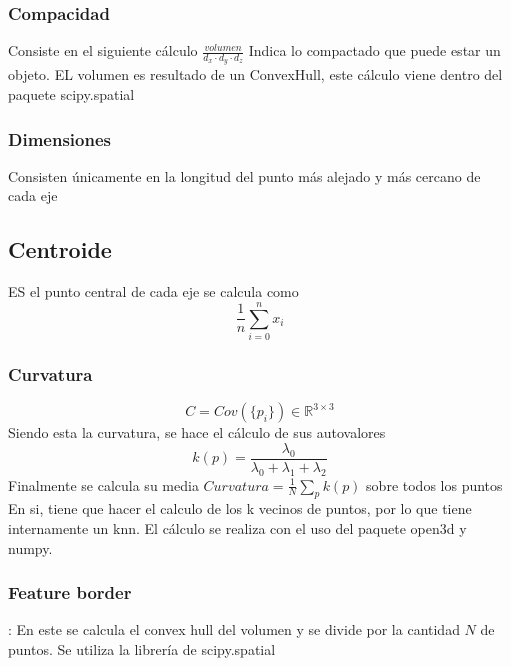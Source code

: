 \documentclass[conference]{IEEEtran}
\begin{document}
 \subsubsection{Compacidad}
 Consiste en el siguiente cálculo
 $\frac{volumen}{d_x\cdot d_y\cdot d_z}$
 Indica lo compactado que puede estar un objeto. EL volumen es resultado de un ConvexHull, este cálculo viene dentro del paquete scipy.spatial

 \subsubsection{Dimensiones}
 Consisten únicamente en la longitud del punto más alejado y más cercano de cada eje
 \subsection{Centroide}
 ES el punto central de cada eje se calcula como
 $$\frac{1}{n}\sum^n_{i=0} x_i$$
 \subsubsection{Curvatura}
 $$C=Cov(\{p_i\}) \in \mathbb{R}^{3\times 3}$$ Siendo esta la curvatura, se hace el cálculo de sus autovalores
 $$k(p)=\frac{\lambda_0}{\lambda_0+\lambda_1+\lambda_2}$$
 Finalmente se calcula su media $Curvatura=\frac{1}{N}\sum_{p}k(p)$ sobre todos los puntos
 En si, tiene que hacer el calculo de los k vecinos de puntos, por lo que tiene internamente un knn. El cálculo se realiza con el uso del paquete open3d y numpy.
 \subsubsection{Feature border}:
 En este se calcula el convex hull del volumen y se divide por la cantidad $N$ de puntos. Se utiliza la librería de scipy.spatial
\end{document}
